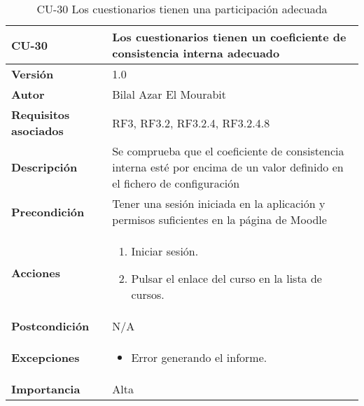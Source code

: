 \begin{table}[H]
	\centering
	\begin{tabularx}{\linewidth}{ p{} p{} }
		\toprule
		\textbf{CU-30}    & \textbf{Los cuestionarios tienen un coeficiente de consistencia interna adecuado}\\
		\toprule
		\textbf{Versión}              & 1.0    \\
		\textbf{Autor}                & Bilal Azar El Mourabit \\
		\textbf{Requisitos asociados} & RF3, RF3.2, RF3.2.4, RF3.2.4.8 \\
		\textbf{Descripción}          & Se comprueba que el coeficiente de consistencia interna esté por encima de un valor definido en el fichero de configuración\\
    		\textbf{Precondición}         & Tener una sesión iniciada en la aplicación y permisos suficientes en la página de Moodle\\
		\textbf{Acciones}             & 
		\begin{enumerate}
			\def\labelenumi{\arabic{enumi}.}
			\tightlist
			\item Iniciar sesión.
            \item Pulsar el enlace del curso en la lista de cursos. 
		\end{enumerate}\\
		\textbf{Postcondición}        & N/A \\
		\textbf{Excepciones}          & \begin{itemize}
		    \item Error generando el informe.
		\end{itemize} \\
		\textbf{Importancia}          & Alta \\
		\bottomrule
	\end{tabularx}
	\caption{CU-30 Los cuestionarios tienen una participación
adecuada}
\end{table}

